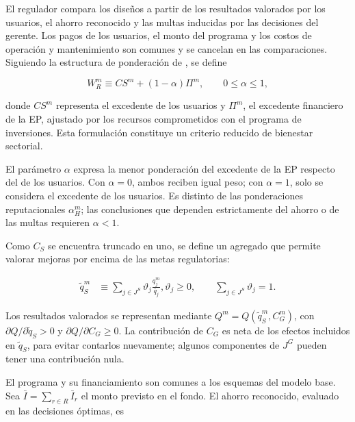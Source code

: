 El regulador compara los diseños a partir de los resultados valorados por los usuarios, el ahorro reconocido y las multas inducidas por las decisiones del gerente. Los pagos de los usuarios, el monto del programa y los costos de operación y mantenimiento son comunes y se cancelan en las comparaciones. Siguiendo la estructura de ponderación de \citet{ovaere2023}, se define

\begin{equation}
\label{eq:bienestar_regulador}
W_R^m\equiv CS^m+(1-\alpha)\Pi^m,
\qquad 0\leq\alpha\leq1,
\end{equation}

donde \(CS^m\) representa el excedente de los usuarios y \(\Pi^m\), el excedente financiero de la EP, ajustado por los recursos comprometidos con el programa de inversiones. Esta formulación constituye un criterio reducido de bienestar sectorial.

El parámetro \(\alpha\) expresa la menor ponderación del excedente de la EP respecto del de los usuarios. Con \(\alpha=0\), ambos reciben igual peso; con \(\alpha=1\), solo se considera el excedente de los usuarios. Es distinto de las ponderaciones reputacionales \(\alpha_H^m\); las conclusiones que dependen estrictamente del ahorro o de las multas requieren \(\alpha<1\).

Como \(C_S\) se encuentra truncado en uno, se define un agregado que permite valorar mejoras por encima de las metas regulatorias:

\begin{equation}
\label{eq:resultado_servicio_no_truncado}
\begin{aligned}
\widetilde q_S^m
&\equiv
\sum_{j\in J^S}\vartheta_j\frac{q_j^m}{\bar q_j},
\vartheta_j\geq0,
\qquad
\sum_{j\in J^S}\vartheta_j=1.
\end{aligned}
\end{equation}

Los resultados valorados se representan mediante \(Q^m=Q(\widetilde q_S^m,C_G^m)\), con \(\partial Q/\partial\widetilde q_S>0\) y \(\partial Q/\partial C_G\geq0\). La contribución de \(C_G\) es neta de los efectos incluidos en \(\widetilde q_S\), para evitar contarlos nuevamente; algunos componentes de \(J^G\) pueden tener una contribución nula.

El programa y su financiamiento son comunes a los esquemas del modelo base. Sea \(\bar I=\sum_{r\in R}\bar I_r\) el monto previsto en el fondo. El ahorro reconocido, evaluado en las decisiones óptimas, es

